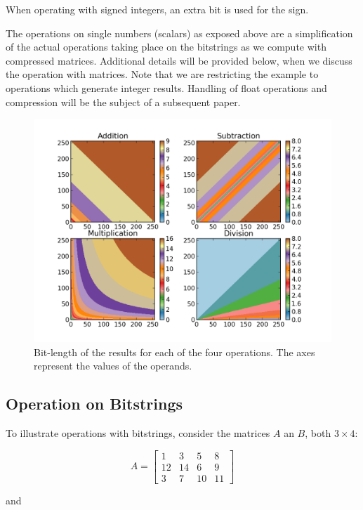 \documentclass[10pt]{article}
\begin{document}
When operating with signed integers, an extra bit is used for the sign.

The operations on single numbers (scalars) as exposed above are a simplification
of the actual operations taking place on the bitstrings as we compute with 
compressed matrices. Additional details will be provided below, when we discuss 
the operation with matrices. Note that we are restricting the example to 
operations which generate integer results. Handling of float operations and 
compression will be the subject of a subsequent paper.

\begin{figure}[h]
 \centering
 \includegraphics[width=12cm]{./bitlength.png}
 \caption{Bit-length of the results for each of the four operations. The axes
represent the values of the operands.}
 \label{fig:bitlength}
\end{figure}

\subsection{Operation on Bitstrings}

To illustrate operations with bitstrings, consider the matrices $A$ an $B$,
both $3 \times 4$:

\begin{equation}
	A = \begin{bmatrix}
			1 & 3 & 5 & 8\\ 
			12 &14  & 6 & 9\\ 
			3 & 7 & 10 & 11
		\end{bmatrix}
\end{equation}

and
\end{document}
